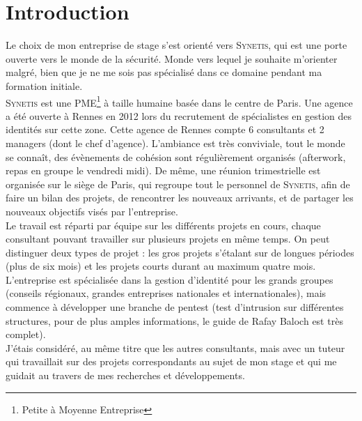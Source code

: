 \section*{Introduction} %
\label{intro}

%
%
%
Le choix de mon entreprise de stage s'est orienté vers \textsc{Synetis}, qui est une porte ouverte vers le monde de la sécurité. Monde vers lequel je souhaite m'orienter malgré, bien que je ne me sois pas spécialisé dans ce domaine pendant ma formation initiale.\\
\textsc{Synetis} est une PME\footnote{Petite à Moyenne Entreprise} à taille humaine basée dans le centre de Paris. Une agence a été ouverte à Rennes en 2012 lors du recrutement de spécialistes en gestion des identités sur cette zone. Cette agence de Rennes compte 6 consultants et 2 managers (dont le chef d'agence). L'ambiance est très conviviale, tout le monde se connaît, des évènements de cohésion sont régulièrement organisés (afterwork, repas en groupe le vendredi midi). De même, une réunion trimestrielle est organisée sur le siège de Paris, qui regroupe tout le personnel de \textsc{Synetis}, afin de faire un bilan des projets, de rencontrer les nouveaux arrivants, et de partager les nouveaux objectifs visés par l'entreprise.\\
Le travail est réparti par équipe sur les différents projets en cours, chaque consultant pouvant travailler sur plusieurs projets en même temps. On peut distinguer deux types de projet : les gros projets s'étalant sur de longues périodes (plus de six mois) et les projets courts durant au maximum quatre mois. L'entreprise est spécialisée dans la gestion d'identité pour les grands groupes (conseils régionaux, grandes entreprises nationales et internationales), mais commence à développer une branche de pentest (test d'intrusion sur différentes structures, pour de plus amples informations, le guide de Rafay Baloch \cite{rba} est très complet).\\
J'étais considéré, au même titre que les autres consultants, mais avec un tuteur qui travaillait sur des projets correspondants au sujet de mon stage et qui me guidait au travers de mes recherches et développements.\\

